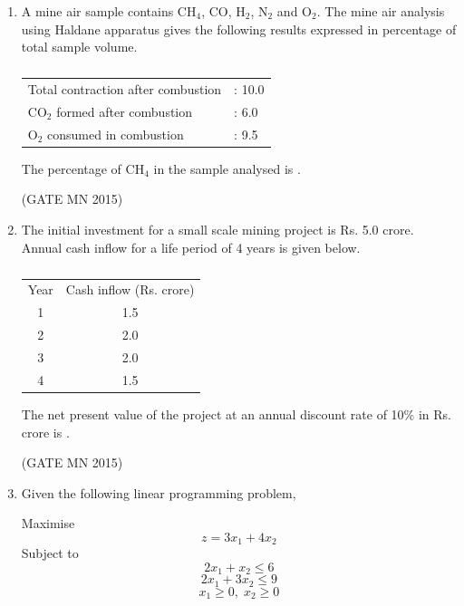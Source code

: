 \documentclass[journal]{IEEEtran}
\begin{document}
\begin{enumerate}
\item A mine air sample contains CH$_4$, CO, H$_2$, N$_2$ and O$_2$. The mine air analysis using Haldane apparatus gives the following results expressed in percentage of total sample volume.  
\begin{table}[H]                                   \centering\normalsize
\begin{tabular}{l l}
Total contraction after combustion & : 10.0 \\
CO$_2$ formed after combustion & : 6.0 \\
O$_2$ consumed in combustion & : 9.5 \\
\end{tabular}                                 
\caption{}                                  
\label{tab:Q50}
\end{table}

The percentage of CH$_4$ in the sample analysed is \underline{\hspace{2cm}}.  

\hfill(GATE MN 2015)


\item The initial investment for a small scale mining project is Rs. 5.0 crore. Annual cash inflow for a life period of 4 years is given below.  
\begin{table}[H]                                
\centering\normalsize
\begin{tabular}{cc}

Year & Cash inflow (Rs. crore) \\
1 & 1.5 \\
2 & 2.0 \\
3 & 2.0 \\
4 & 1.5 \\

\end{tabular}                               
\caption{}                                
\label{tab:Q51}
\end{table}

The net present value of the project at an annual discount rate of 10\% in Rs. crore is \underline{\hspace{2cm}}. 

\hfill(GATE MN 2015)

\item Given the following linear programming problem,  

Maximise \[
z = 3x_1 + 4x_2
\]  
Subject to  
\[
2x_1 + x_2 \leq 6
\]
\[
2x_1 + 3x_2 \leq 9
\]
\[
x_1 \geq 0, \; x_2 \geq 0
\]


\end{enumerate}
\end{document}
